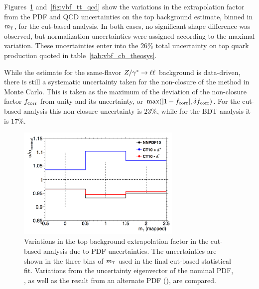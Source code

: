 Figures~\ref{fig:vbf_tt_pdf} and~\ref{fig:vbf_tt_qcd} show the variations in the extrapolation factor from the PDF and QCD uncertainties on the top background estimate, binned in $m_{\textrm{\footnotesize\sc t}}$, for the cut-based analysis. In both cases, no significant shape difference was observed, but normalization uncertainties were assigned according to the maximal variation. These uncertainties enter into the $26\%$ total uncertainty on top quark production quoted in table~\ref{tab:vbf_cb_theosys}.

While the estimate for the same-flavor $Z/\gamma^{\ast}\to\ell\ell$ background is data-driven, there is still a systematic uncertainty taken for the non-closure of the method in Monte Carlo. This is taken as the maximum of the deviation of the non-closure factor $f_{\rm corr}$ from unity and its uncertainty, or $\textrm{max}(|1 - f_{\rm corr}|, \delta f_{\rm corr})$. For the cut-based analysis this non-closure uncertainty is $23$\%, while for the BDT analysis it is $17\%$.

\begin{figure}[h!]
  \centering
  \captionsetup{justification=centering}
  \includegraphics[width=0.7\textwidth]{figures/VBF_cb_tt_pdf}
  \caption{Variations in the top background extrapolation factor in the cut-based analysis due to PDF uncertainties. The uncertainties are shown in the three bins of $m_{\textrm{\footnotesize\sc t}}$ used in the final cut-based statistical fit. Variations from the uncertainty eigenvector of the nominal PDF, , as well as the result from an alternate PDF (), are compared.}
  \label{fig:vbf_tt_pdf}
\end{figure}

